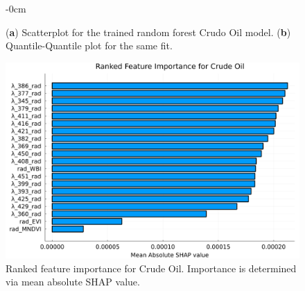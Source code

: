 \documentclass[remotesensing,article,submit,pdftex,moreauthors]{Definitions/mdpi}
\begin{document}
\begin{figure}[H]
    \begin{adjustwidth}{-\extralength}{0cm}
    \centering
    \qquad
    \end{adjustwidth}
    \caption{(\textbf{a}) Scatterplot for the trained random forest Crudo Oil model. (\textbf{b}) Quantile-Quantile plot for the same fit.}
    \label{CO_fitresult}
\end{figure}

\begin{figure}[H]
    \includegraphics[width=10.5 cm]{images/CO/rfr_CO_featureImportance.png}
    \caption{Ranked feature importance for Crude Oil. Importance is determined via mean absolute SHAP value. \label{CO_shapely}}
\end{figure}
\end{document}
